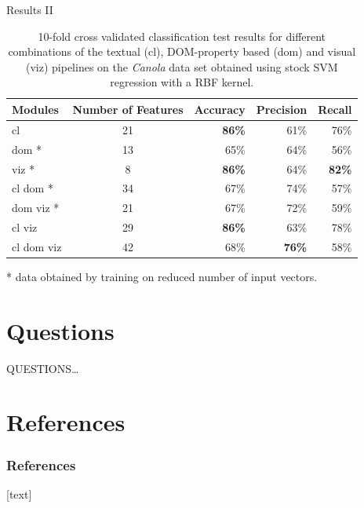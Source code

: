 \documentclass{beamer}
\begin{document}
    \begin{frame}{Results II}
        \begin{center}
            \begin{table}
                \caption{10-fold cross validated classification test results for different combinations of the textual (cl), DOM-property based (dom) and visual (viz) pipelines on the \textit{Canola} data set obtained using stock SVM regression with a RBF kernel.}
                \label{t:res}
                \centering
                \begin{tabular}[h]{l|c|rrr}
                    Modules & Number of Features & Accuracy & Precision & Recall \\
                    \hline
                    cl         & 21 & \textbf{86\%} & 61\% & 76\% \\
                    dom *      & 13 & 65\% & 64\% & 56\% \\
                    viz *      &  8 & \textbf{86\%} & 64\% & \textbf{82\%} \\
                    cl dom *   & 34 & 67\% & 74\% & 57\% \\
                    dom viz *  & 21 & 67\% & 72\% & 59\% \\
                    cl viz     & 29 & \textbf{86\%} & 63\% & 78\% \\
                    cl dom viz & 42 & 68\% & \textbf{76\%} & 58\% \\
                \end{tabular}
                * data obtained by training on reduced number of input vectors.
            \end{table}
        \end{center}
    \end{frame}

%
%
\section{Questions}
\begin{frame}{}
    \begin{block}{}
        QUESTIONS\ldots
    \end{block}
\end{frame}

%

	\section{References}
	\begin{frame}[allowframebreaks]
		\frametitle{References}
	
		\footnotesize
		
		
		\nocite{*}
	\end{frame}
%
\end{document}

